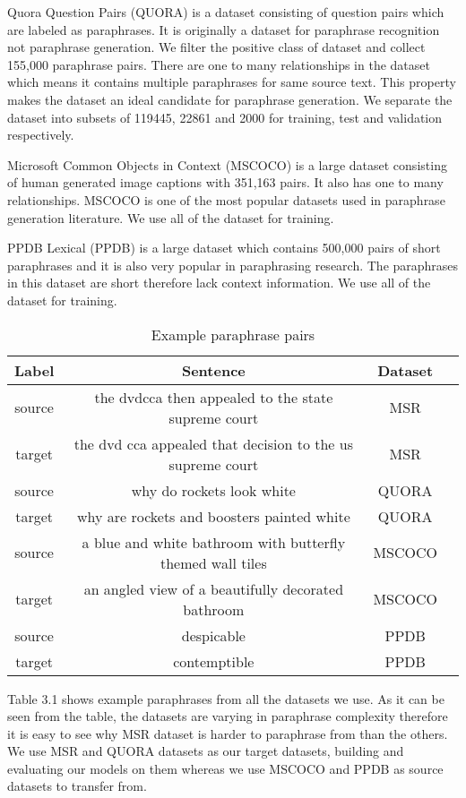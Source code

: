 Quora Question Pairs (QUORA) is a dataset consisting of question pairs which are labeled as paraphrases. It is originally a dataset for paraphrase recognition not paraphrase generation. We filter the positive class of dataset and collect 155,000 paraphrase pairs. There are one to many relationships in the dataset which means it contains multiple paraphrases for same source text. This property makes the dataset an ideal candidate for paraphrase generation. We separate the dataset into subsets of 119445, 22861 and 2000 for training, test and validation respectively.

Microsoft Common Objects in Context (MSCOCO) \cite{mscoco} is a large dataset consisting of human generated image captions with 351,163 pairs. It also has one to many relationships. MSCOCO is one of the most popular datasets used in paraphrase generation literature. We use all of the dataset for training.

PPDB Lexical (PPDB) \cite{ppdb} is a large dataset which contains 500,000 pairs of short paraphrases and it is also very popular in paraphrasing research. The paraphrases in this dataset are short therefore lack context information. We use all of the dataset for training.

\begin{table}
\small
 \begin{tabular}{||c c c c||} 
 \hline
 Label & Sentence & Dataset & \\ [0.5ex] 
 \hline
 source & the dvdcca then appealed to the state supreme court & MSR & \\
 \hline
 target & the dvd cca appealed that decision to the us supreme court & MSR & \\
  \hline
 source & why do rockets look white & QUORA & \\
 \hline
 target & why are rockets and boosters painted white & QUORA & \\
 \hline
 source & a blue and white bathroom with butterfly themed wall tiles & MSCOCO & \\
 \hline
 target & an angled view of a beautifully decorated bathroom & MSCOCO & \\
 \hline
 source & despicable & PPDB & \\
 \hline
 target & contemptible & PPDB & \\
 \hline
\end{tabular}
\caption{Example paraphrase pairs}
\end{table}


Table 3.1 shows example paraphrases from all the datasets we use. As it can be seen from the table, the datasets are varying in paraphrase complexity therefore it is easy to see why MSR dataset is harder to paraphrase from than the others. We use MSR and QUORA datasets as our target datasets, building and evaluating our models on them whereas we use MSCOCO and PPDB as source datasets to transfer from.

